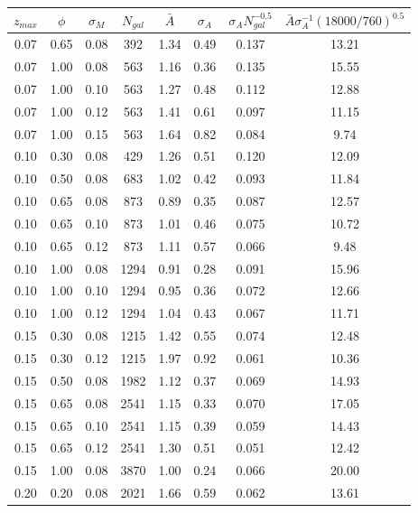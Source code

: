 \documentclass{aastex62}   	%
\begin{document}
\begin{table}
   \centering
   \begin{tabular}{|ccc|ccccc|} %
   \hline
$z_{max}$ & $\phi$ & $\sigma_{M}$ & $N_{gal}$ & $\bar{A}$ & $\sigma_A$ & $\sigma_A N_{gal}^{-0.5}$ & $\bar{A} \sigma_A^{-1} (18000/760)^{0.5}$ \\
\hline
0.07 & 0.65 & 0.08 & 392 &   1.34 &   0.49 &  0.137 &  13.21 \\
0.07 & 1.00 & 0.08 & 563 &   1.16 &   0.36 &  0.135 &  15.55 \\
0.07 & 1.00 & 0.10 & 563 &   1.27 &   0.48 &  0.112 &  12.88 \\
0.07 & 1.00 & 0.12 & 563 &   1.41 &   0.61 &  0.097 &  11.15 \\
0.07 & 1.00 & 0.15 & 563 &   1.64 &   0.82 &  0.084 &   9.74 \\
0.10 & 0.30 & 0.08 & 429 &   1.26 &   0.51 &  0.120 &  12.09 \\
0.10 & 0.50 & 0.08 & 683 &   1.02 &   0.42 &  0.093 &  11.84 \\
0.10 & 0.65 & 0.08 & 873 &   0.89 &   0.35 &  0.087 &  12.57 \\
0.10 & 0.65 & 0.10 & 873 &   1.01 &   0.46 &  0.075 &  10.72 \\
0.10 & 0.65 & 0.12 & 873 &   1.11 &   0.57 &  0.066 &   9.48 \\
0.10 & 1.00 & 0.08 & 1294 &   0.91 &   0.28 &  0.091 &  15.96 \\
0.10 & 1.00 & 0.10 & 1294 &   0.95 &   0.36 &  0.072 &  12.66 \\
0.10 & 1.00 & 0.12 & 1294 &   1.04 &   0.43 &  0.067 &  11.71 \\
0.15 & 0.30 & 0.08 & 1215 &   1.42 &   0.55 &  0.074 &  12.48 \\
0.15 & 0.30 & 0.12 & 1215 &   1.97 &   0.92 &  0.061 &  10.36 \\
0.15 & 0.50 & 0.08 & 1982 &   1.12 &   0.37 &  0.069 &  14.93 \\
0.15 & 0.65 & 0.08 & 2541 &   1.15 &   0.33 &  0.070 &  17.05 \\
0.15 & 0.65 & 0.10 & 2541 &   1.15 &   0.39 &  0.059 &  14.43 \\
0.15 & 0.65 & 0.12 & 2541 &   1.30 &   0.51 &  0.051 &  12.42 \\
0.15 & 1.00 & 0.08 & 3870 &   1.00 &   0.24 &  0.066 &  20.00 \\
0.20 & 0.20 & 0.08 & 2021 &   1.66 &   0.59 &  0.062 &  13.61 \\

\end{tabular}
\end{table}
\end{document}
